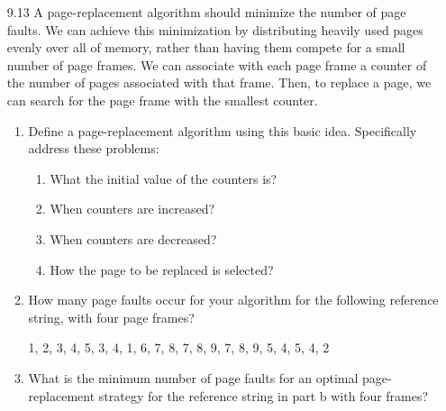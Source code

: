\begin{enumerate}
    \item [9.13] A page-replacement algorithm should minimize the number of page faults. We can achieve this minimization by distributing heavily used pages evenly over all of memory, rather than having them compete for a small number of page frames. We can associate with each page frame a counter of the number of pages associated with that frame. Then, to replace a page, we can search for the page frame with the smallest counter.
    
    \begin{enumerate}
        \item Define a page-replacement algorithm using this basic idea. Specifically address these problems:
        
        \begin{enumerate}
            \item What the initial value of the counters is?
            \item When counters are increased?
            \item When counters are decreased?
            \item How the page to be replaced is selected?
        \end{enumerate}
        
        \item How many page faults occur for your algorithm for the following reference string, with four page frames?
        
        \begin{center}
            1, 2, 3, 4, 5, 3, 4, 1, 6, 7, 8, 7, 8, 9, 7, 8, 9, 5, 4, 5, 4, 2
        \end{center}
        
        \item What is the minimum number of page faults for an optimal page-replacement strategy for the reference string in part b with four frames?
        
    \end{enumerate}
    
\end{enumerate}
